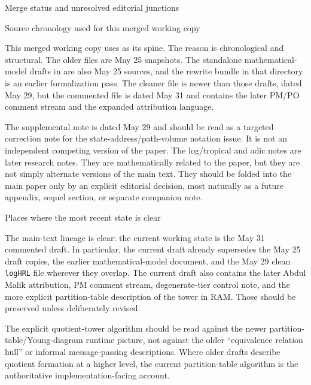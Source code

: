 \documentclass[11pt]{article}
\begin{document}
\begin{section}{Merge status and unresolved editorial junctions}

\begin{subsection}{Source chronology used for this merged working copy}

This merged working copy uses
as its spine.  The reason is chronological and structural.  The older
files are May 25 snapshots.  The standalone mathematical-model drafts in
are also May 25 sources, and the rewrite bundle in that directory is an
earlier formalization pass.  The cleaner
file is newer than those drafts, dated May 29, but the commented
file is dated May 31 and contains the later PM/PO comment stream and the
expanded attribution language.

The supplemental note
is dated May 29 and should be read as a targeted correction note for the
state-address/path-volume notation issue.  It is not an independent competing
version of the paper.  The log/tropical and adic notes are later research
notes.  They are mathematically related to the paper, but they are not simply
alternate versions of the main text.  They should be folded into the main
paper only by an explicit editorial decision, most naturally as a future
appendix, sequel section, or separate companion note.

\end{subsection}

\begin{subsection}{Places where the most recent state is clear}

The main-text lineage is clear: the current working state is the May 31
commented draft.  In particular, the current draft already supersedes the
May 25 draft copies, the earlier mathematical-model document, and the May 29
clean \texttt{logHRL} file wherever they overlap.  The current draft also
contains the later Abdul Malik attribution, PM comment stream, degenerate-tier
control note, and the more explicit partition-table description of the tower
in RAM.  Those should be preserved unless deliberately revised.

The explicit quotient-tower algorithm should be read against the newer
partition-table/Young-diagram runtime picture, not against the older
``equivalence relation hull'' or informal message-passing descriptions.  Where
older drafts describe quotient formation at a higher level, the current
partition-table algorithm is the authoritative implementation-facing account.


\end{subsection}
\end{section}
\end{document}
